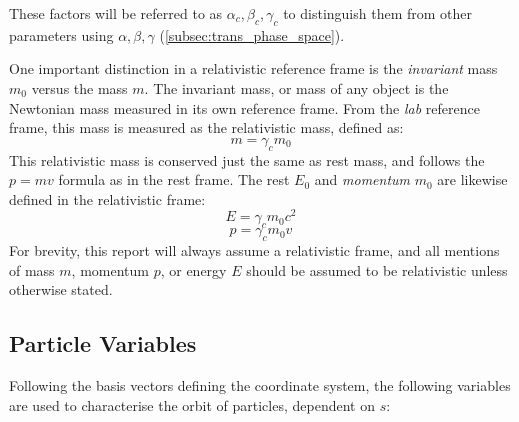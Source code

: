 \documentclass[a4paper,twoside,11pt]{report}
\begin{document}
These factors will be referred to as $\alpha_c, \beta_c, \gamma_c$ to distinguish them from other parameters using $\alpha, \beta, \gamma$ (\autoref{subsec:trans_phase_space}).

One important distinction in a relativistic reference frame is the \textit{invariant} mass $m_0$ versus the  mass $m$. The invariant mass, or  mass of any object is the Newtonian mass measured in its own reference frame. From the \textit{lab} reference frame, this mass is measured as the relativistic mass, defined as:
\begin{equation}
    m=\gamma_c m_0
\end{equation}
This relativistic mass is conserved just the same as rest mass, and follows the $p=mv$ formula as in the rest frame. 
The rest  $E_0$ and \textit{momentum} $m_0$ are likewise defined in the relativistic frame:
\begin{equation}
    E=\gamma_c m_0c^2
    \label{eq:relativistic_energy}
\end{equation}
\begin{equation}
    p=\gamma_c m_0v
    \label{eq:relativistic_momentum}
\end{equation}
For brevity, this report will always assume a relativistic frame, and all mentions of mass $m$, momentum $p$, or energy $E$ should be assumed to be relativistic unless otherwise stated.

\subsection{Particle Variables}

Following the basis vectors defining the coordinate system, the following variables are used to characterise the orbit of particles, dependent on $s$:
\end{document}
